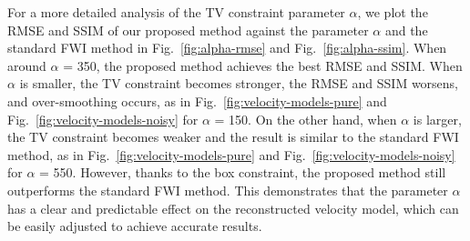 For a more detailed analysis of the TV constraint parameter $\alpha$, we plot the RMSE and SSIM of our proposed method against the parameter $\alpha$ and the standard FWI method in Fig.~\ref{fig:alpha-rmse} and Fig.~\ref{fig:alpha-ssim}.
When around $\alpha$ = 350, the proposed method achieves the best RMSE and SSIM.
When $\alpha$ is smaller, the TV constraint becomes stronger, the RMSE and SSIM worsens, and over-smoothing occurs, as in Fig.~\ref{fig:velocity-models-pure} and Fig.~\ref{fig:velocity-models-noisy} for $\alpha$ = 150.
On the other hand, when $\alpha$ is larger, the TV constraint becomes weaker and the result is similar to the standard FWI method, as in Fig.~\ref{fig:velocity-models-pure} and Fig.~\ref{fig:velocity-models-noisy} for $\alpha$ = 550.
However, thanks to the box constraint, the proposed method still outperforms the standard FWI method.
This demonstrates that the parameter $\alpha$ has a clear and predictable effect on the reconstructed velocity model, which can be easily adjusted to achieve accurate results.

